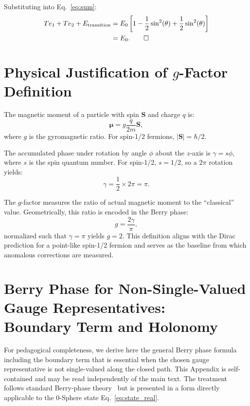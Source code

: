 \documentclass[%
 reprint,
 amsmath,amssymb,
 aps,
 prb,
]{revtex4-2}
\numberwithin{equation}{section}
\theoremstyle{definition}
\theoremstyle{remark}
\begin{document}
Substituting into Eq.~\eqref{eq:sum}:
\begin{align}
Te_1 + Te_2 + E_{\text{transition}} &= E_0 \left[1 - \frac{1}{2}\sin^2(\theta) + \frac{1}{2}\sin^2(\theta)\right] \nonumber \\
&= E_0. \qedhere
\end{align}

\section{Physical Justification of $g$-Factor Definition}

The magnetic moment of a particle with spin $\bm{S}$ and charge $q$ is:
\begin{equation}
\bm{\mu} = g \frac{q}{2m} \bm{S},
\label{eq:magnetic_moment}
\end{equation}
where $g$ is the gyromagnetic ratio. For spin-1/2 fermions, $|\bm{S}| = \hbar/2$.

The accumulated phase under rotation by angle $\phi$ about the $z$-axis is $\gamma = s\phi$, where $s$ is the spin quantum number. For spin-1/2, $s = 1/2$, so a $2\pi$ rotation yields:
\begin{equation}
\gamma = \frac{1}{2} \times 2\pi = \pi.
\label{eq:spin_half_phase}
\end{equation}

The $g$-factor measures the ratio of actual magnetic moment to the ``classical'' value. Geometrically, this ratio is encoded in the Berry phase:
\begin{equation}
g = \frac{2\gamma}{\pi},
\label{eq:g_geometric}
\end{equation}
normalized such that $\gamma = \pi$ yields $g = 2$. This definition aligns with the Dirac prediction for a point-like spin-1/2 fermion and serves as the baseline from which anomalous corrections are measured.

\section{Berry Phase for Non-Single-Valued Gauge Representatives: \\
Boundary Term and Holonomy}
\label{app:boundary_term}

For pedagogical completeness, we derive here the general Berry phase formula including the boundary term that is essential when the chosen gauge representative is not single-valued along the closed path.  This Appendix is self-contained and may be read independently of the main text.  The treatment follows standard Berry-phase theory~\cite{Berry1984,Aharonov1987} but is presented in a form directly applicable to the 0-Sphere state Eq.~\eqref{eq:state_real}.
\end{document}
